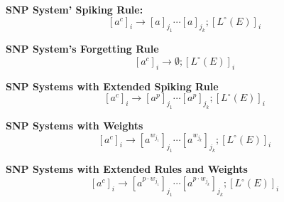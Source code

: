 \documentclass[a4paper]{article}
\theoremstyle{definition}
\newcommand{\ra}{\rightarrow}
\begin{document}
\noindent \textbf{SNP System' Spiking Rule:}
$${[a^c]}_i \ra {[a]}_{j_1} \cdots [a]_{j_k};{[L^{\circ}(E)]}_i$$

\noindent \textbf{SNP System's Forgetting Rule}
$${[a^c]}_i \ra \emptyset;{[L^{\circ}(E)]}_i$$

\noindent \textbf{SNP Systems with  Extended Spiking Rule}
$${[a^c]}_i \ra {[a^p]}_{j_1} \cdots {[a^p]}_{j_k};{[L^{\circ}(E)]}_i$$

\noindent \textbf{SNP Systems with Weights}
$$[a^c]_i \ra [a^{w_{j_1}}]_{j_1} \cdots [a^{w_{j_k}}]_{j_k};[L^{\circ}(E)]_i$$

\noindent \textbf{SNP Systems with Extended Rules and  Weights}
$$[a^c]_i \ra [a^{p \cdot w_{j_1}}]_{j_1} \cdots [a^{p\cdot w_{j_k}}]_{j_k};[L^{\circ}(E)]_i$$




\end{document}
